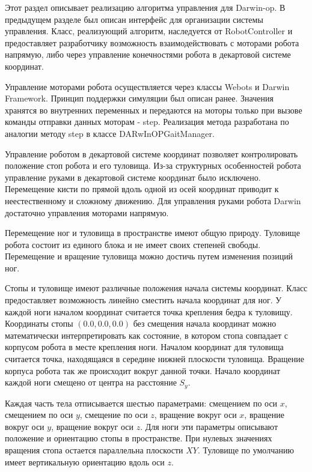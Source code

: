 Этот раздел описывает реализацию алгоритма управления для Darwin-op. В предыдущем разделе был описан интерфейс для организации системы управления. Класс, реализующий алгоритм, наследуется от RobotController и предоставляет разработчику возможность взаимодействовать с моторами робота напрямую, либо через управление конечностями робота в декартовой системе координат.

Управление моторами робота осуществляется через классы  Webots и Darwin Framework. Принцип поддержки симуляции был описан ранее. Значения хранятся во внутренних переменных и передаются на моторы только при вызове команды отправки данных моторам - step. Реализация метода разработана по аналогии методу step в классе DARwInOPGaitManager. 

Управление роботом в декартовой системе координат позволяет контролировать положение стоп робота и его туловища. Из-за структурных особенностей робота управление руками в декартовой системе координат было исключено. Перемещение кисти по прямой вдоль одной из осей координат приводит к неестественному и сложному движению. Для управления руками робота Darwin достаточно управления моторами напрямую.

Перемещение ног и туловища в пространстве имеют общую природу. Туловище робота состоит из единого блока и не имеет своих степеней свободы. Перемещение и вращение туловища можно достичь путем изменения позиций ног. 

Стопы и туловище имеют различные положения начала системы координат. Класс предоставляет возможность линейно сместить начала координат для ног. У каждой ноги началом координат считается точка крепления бедра к туловищу. Координаты стопы $(0.0, 0.0, 0.0)$ без смещения начала координат можно математически интерпретировать как состояние, в котором стопа совпадает с корпусом робота в месте крепления ноги. Началом координат для туловища считается точка, находящаяся в середине нижней плоскости туловища. Вращение корпуса робота так же происходит вокруг данной точки. Начало координат каждой ноги смещено от центра на расстояние $S_{y}$.

Каждая часть тела отписывается шестью параметрами: смещением по оси $x$, смещением по оси $y$, смещение по оси $z$, вращение вокруг оси $x$, вращение вокруг оси $y$, вращение вокруг оси $z$. Для ноги эти параметры описывают положение и ориентацию стопы в пространстве. При нулевых значениях вращения стопа остается параллельна плоскости $XY$. Туловище по умолчанию имеет вертикальную ориентацию вдоль оси $z$.

